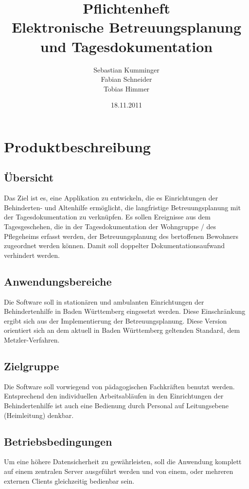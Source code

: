\documentclass[a4paper,10pt]{article}
\author{Sebastian Kumminger\\
	Fabian Schneider\\
	Tobias Himmer}
\title{Pflichtenheft\\
	Elektronische Betreuungsplanung und Tagesdokumentation}
\date{18.11.2011}
\begin{document}
\maketitle

\tableofcontents
\newpage

\section{Produktbeschreibung}
\subsection{Übersicht}
Das Ziel ist es, eine Applikation zu entwickeln, die es Einrichtungen der Behinderten- und Altenhilfe ermöglicht,
die langfristige Betreuungsplanung mit der Tagesdokumentation zu verknüpfen. Es sollen Ereignisse aus dem Tagesgeschehen,
die in der Tagesdokumentation der Wohngruppe / des Pflegeheims erfasst werden,
der Betreuungsplanung des bertoffenen Bewohners zugeordnet werden können.
Damit soll doppelter Dokumentationsaufwand verhindert werden.
\subsection{Anwendungsbereiche}
Die Software soll in stationären und ambulanten Einrichtungen der Behindertenhilfe in Baden Württemberg eingesetzt werden. 
Diese Einschränkung ergibt sich aus der Implementierung der Betreuungsplanung. Diese Version orientiert sich an dem aktuell in Baden Württemberg geltenden 
Standard, dem Metzler-Verfahren. 
\subsection{Zielgruppe}
Die Software soll vorwiegend von pädagogischen Fachkräften benutzt werden. Entsprechend den individuellen Arbeitsabläufen in den 
Einrichtungen der Behindertenhilfe ist auch eine Bedienung durch Personal auf Leitungsebene (Heimleitung) denkbar.
\subsection{Betriebsbedingungen}
Um eine höhere Datensicherheit zu gewährleisten, soll die Anwendung komplett auf einem
zentralen Server ausgeführt werden und von einem, oder mehreren externen Clients gleichzeitig bedienbar sein.
\end{document}
